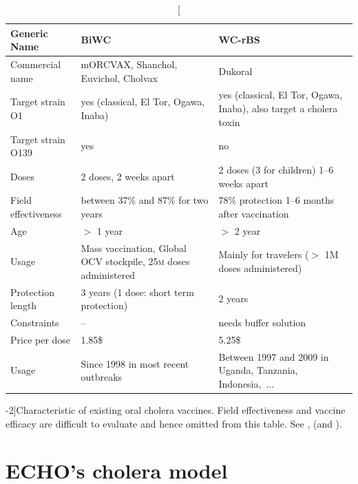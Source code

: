  \begin{table}[h]
\centering\small
\label{tab:prior}
\begin{tabular}{lp{40mm}p{40mm}}
\toprule
Generic Name &  BiWC & WC-rBS\\ 
\midrule
Commercial name   &  mORCVAX, Shanchol,  Euvichol, Cholvax & Dukoral  \\
Target strain O1 &   yes (classical, El Tor, Ogawa, Inaba)& yes (classical, El Tor, Ogawa, Inaba), also target a cholera toxin  \\
Target strain O139   &  yes &      no     \\
Doses   &  2 doses, 2 weeks apart & 2 doses (3 for children) 1--6 weeks apart  \\
Field effectiveness  & between 37\% and 87\% for two years & 78\% protection 1--6 months after vaccination\\
Age   &  $>$ 1 year & $>$ 2 year      \\
Usage & Mass vaccination, Global OCV stockpile, 25\textsc{m} doses administered & Mainly for travelers ($>$ 1M doses administered)\\
Protection length & 3 years (1 dose: short term protection) & 2 years\\
Constraints & -- & needs buffer solution\\
Price per dose & 1.85\$ & 5.25\$ \\ 
Usage & Since 1998 in most recent outbreaks & Between 1997 and 2009 in Uganda, Tanzania, Indonesia,~... \\
\bottomrule
\end{tabular}
\caption[Characteristic of existing oral cholera vaccines][-2\baselineskip]{Characteristic of existing oral cholera vaccines. Field effectiveness and vaccine efficacy are difficult to evaluate and hence omitted from this table. See ,  (and ).}%
\label{tab:vacc}
\end{table}

\section{ECHO's cholera model}

